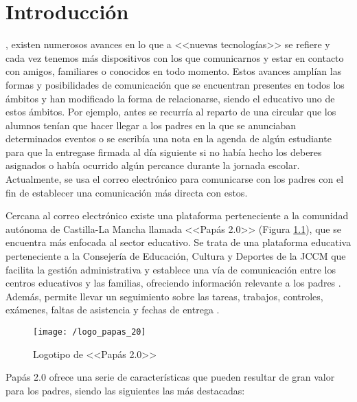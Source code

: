 \chapter{Introducción}
\label{chap:intro}

, existen numerosos avances en lo que a <<nuevas tecnologías>> se refiere y cada vez tenemos más dispositivos con los que comunicarnos y estar en contacto con amigos, familiares o conocidos en todo momento. Estos avances amplían las formas y posibilidades de comunicación que se encuentran presentes en todos los ámbitos y han modificado la forma de relacionarse, siendo el educativo uno de estos ámbitos. Por ejemplo, antes se recurría al reparto de una circular que los alumnos tenían que hacer llegar a los padres en la que se anunciaban determinados eventos o se escribía una nota en la agenda de algún estudiante para que la entregase firmada al día siguiente si no había hecho los deberes asignados o había ocurrido algún percance durante la jornada escolar. Actualmente, se usa el correo electrónico para comunicarse con los padres con el fin de establecer una comunicación más directa con estos.

Cercana al correo electrónico existe una plataforma perteneciente a la comunidad autónoma de Castilla-La Mancha llamada <<Papás 2.0>> (Figura \ref{fig:papas20}), que se encuentra más enfocada al sector educativo. Se trata de una plataforma educativa perteneciente a la Consejería de Educación, Cultura y Deportes de la \acf{JCCM} que facilita la gestión administrativa y establece una vía de comunicación entre los centros educativos y las familias, ofreciendo información relevante a los padres \cite{JCCM2017}. Además, permite llevar un seguimiento sobre las tareas, trabajos, controles, exámenes, faltas de asistencia y fechas de entrega \cite{JCCM2010}.

\begin{figure}[!h]
	\begin{center}
		\texttt{[image: /logo\_papas\_20]}
		\caption{Logotipo de <<Papás 2.0>>}
		\label{fig:papas20}
	\end{center}
\end{figure}

\newpage

Papás 2.0 ofrece una serie de características que pueden resultar de gran valor para los padres, siendo las siguientes las más destacadas:

